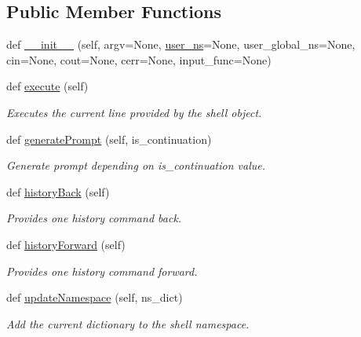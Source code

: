 \subsection*{Public Member Functions}
\begin{DoxyCompactItemize}
\item 
def \hyperlink{classvisualizer_1_1ipython__view_1_1IterableIPShell_a3643f0fa2c02de39678b4a648c2a9a9e}{\+\_\+\+\_\+init\+\_\+\+\_\+} (self, argv=None, \hyperlink{classvisualizer_1_1ipython__view_1_1IterableIPShell_a7b1a1512a93db333ef833a37845015b2}{user\+\_\+ns}=None, user\+\_\+global\+\_\+ns=None, cin=None, cout=None, cerr=None, input\+\_\+func=None)
\item 
def \hyperlink{classvisualizer_1_1ipython__view_1_1IterableIPShell_af805ce6d5c631ccd90fe7751d1c8de55}{execute} (self)
\begin{DoxyCompactList}\small\item\em Executes the current line provided by the shell object. \end{DoxyCompactList}\item 
def \hyperlink{classvisualizer_1_1ipython__view_1_1IterableIPShell_ab3757cf663f77f0ec3c791e815ed21d4}{generate\+Prompt} (self, is\+\_\+continuation)
\begin{DoxyCompactList}\small\item\em Generate prompt depending on is\+\_\+continuation value. \end{DoxyCompactList}\item 
def \hyperlink{classvisualizer_1_1ipython__view_1_1IterableIPShell_a708ac9d5b786b5030e34c33f89c40b39}{history\+Back} (self)
\begin{DoxyCompactList}\small\item\em Provides one history command back. \end{DoxyCompactList}\item 
def \hyperlink{classvisualizer_1_1ipython__view_1_1IterableIPShell_ab9b3ab4f2615c08045eff31e2b18d88d}{history\+Forward} (self)
\begin{DoxyCompactList}\small\item\em Provides one history command forward. \end{DoxyCompactList}\item 
def \hyperlink{classvisualizer_1_1ipython__view_1_1IterableIPShell_a23eff951118c1fe6c00e2c1492a0f6ff}{update\+Namespace} (self, ns\+\_\+dict)
\begin{DoxyCompactList}\small\item\em Add the current dictionary to the shell namespace. \end{DoxyCompactList}\item 

\end{DoxyCompactItemize}
